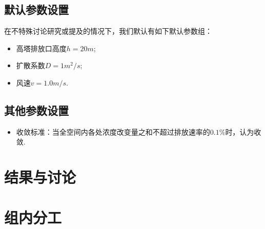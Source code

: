 \documentclass{article}
\begin{document}
	\subsection{默认参数设置}
	在不特殊讨论研究或提及的情况下，我们默认有如下默认参数组：
	\begin{itemize}
		\item 高塔排放口高度$h=20m$;
		\item 扩散系数$D=1m^2/s$;
		\item 风速$v=1.0m/s$.
	\end{itemize}

	\subsection{其他参数设置}
	\begin{itemize}
		\item 收敛标准：当全空间内各处浓度改变量之和不超过排放速率的$0.1\%$时，认为收敛.
	\end{itemize}
	
	\section{结果与讨论}
	
	\section{组内分工}
	
%	
	
\end{document}
